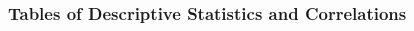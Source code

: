 \documentclass[]{article}
\begin{document}
\newpage

\subsubsection{Tables of Descriptive Statistics and Correlations}
\label{sec:correlation-tables}



\newpage






\newpage
\theendnotes

\newpage
\begin{auxmulticols}{2}
\singlespacing 


\end{auxmulticols}

\newpage
{
\hypersetup{linkcolor=black}
\setcounter{tocdepth}{3}
\tableofcontents
}
\end{document}
